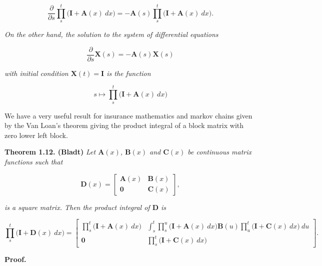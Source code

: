 \documentclass[
]{book}
\begin{document}
\[
\frac{\partial}{\partial s}\prod_{s}^t\big(\mathbf{I}+\mathbf{A}(x)\ dx\big)=-\mathbf{A}(s)\prod_{s}^t\big(\mathbf{I}+\mathbf{A}(x)\ dx\big).
\]

\emph{On the other hand, the solution to the system of differential equations}

\[
\frac{\partial}{\partial s}\mathbf{X}(s)=-\mathbf{A}(s)\mathbf{X}(s)
\]

\emph{with initial condition \(\mathbf{X}(t)=\mathbf{I}\) is the function}

\[
s\mapsto\prod_{s}^t\big(\mathbf{I}+\mathbf{A}(x)\ dx\big)
\]

We have a very useful result for insurance mathematics and markov chains given by the Van Loan's theorem giving the product integral of a block matrix with zero lower left block.

\textbf{Theorem 1.12. (Bladt)} \emph{Let \(\mathbf{A}(x)\), \(\mathbf{B}(x)\) and \(\mathbf{C}(x)\) be continuous matrix functions such that}

\[
\mathbf{D}(x)=\begin{bmatrix}
\mathbf{A}(x) & \mathbf{B}(x)\\
\mathbf{0} & \mathbf{C}(x)
\end{bmatrix},
\]

\emph{is a square matrix. Then the product integral of \(\mathbf{D}\) is}

\[
\prod_{s}^t\big(\mathbf{I}+\mathbf{D}(x)\ dx\big)=
\begin{bmatrix}
\prod_{s}^t\big(\mathbf{I}+\mathbf{A}(x)\ dx\big) & \int_s^t\prod_{s}^u\big(\mathbf{I}+\mathbf{A}(x)\ dx\big)\mathbf{B}(u)\prod_{u}^t\big(\mathbf{I}+\mathbf{C}(x)\ dx\big)\ du\\
\mathbf{0} & \prod_{s}^t\big(\mathbf{I}+\mathbf{C}(x)\ dx\big)
\end{bmatrix}.
\]

\textbf{Proof.}
\end{document}
